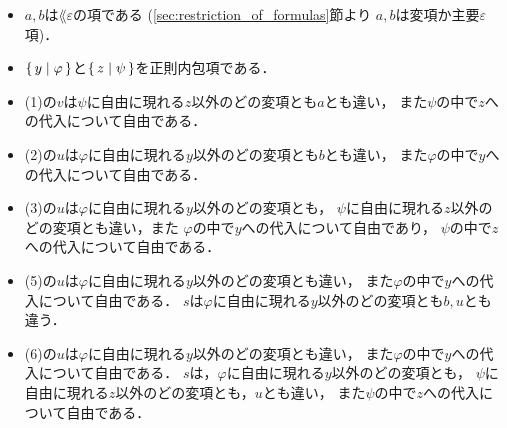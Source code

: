 	\begin{itemize}
		\item $a,b$は$\lang{\varepsilon}$の項である
			(\ref{sec:restriction_of_formulas}節より
			$a,b$は変項か主要$\varepsilon$項)．
		
		\item $\{\, y \mid \varphi\, \}$と$\{\, z \mid \psi\, \}$を正則内包項である．
		
		\item (1)の$v$は$\psi$に自由に現れる$z$以外のどの変項とも$a$とも違い，
			また$\psi$の中で$z$への代入について自由である．
		
		\item (2)の$u$は$\varphi$に自由に現れる$y$以外のどの変項とも$b$とも違い，
			また$\varphi$の中で$y$への代入について自由である．
			
		\item (3)の$u$は$\varphi$に自由に現れる$y$以外のどの変項とも，
			$\psi$に自由に現れる$z$以外のどの変項とも違い，また
			$\varphi$の中で$y$への代入について自由であり，
			$\psi$の中で$z$への代入について自由である．
		
		\item (5)の$u$は$\varphi$に自由に現れる$y$以外のどの変項とも違い，
			また$\varphi$の中で$y$への代入について自由である．
			$s$は$\varphi$に自由に現れる$y$以外のどの変項とも$b,u$とも違う．
		
		\item (6)の$u$は$\varphi$に自由に現れる$y$以外のどの変項とも違い，
			また$\varphi$の中で$y$への代入について自由である．
			$s$は，$\varphi$に自由に現れる$y$以外のどの変項とも，
			$\psi$に自由に現れる$z$以外のどの変項とも，$u$とも違い，
			また$\psi$の中で$z$への代入について自由である．
			

\end{itemize}
